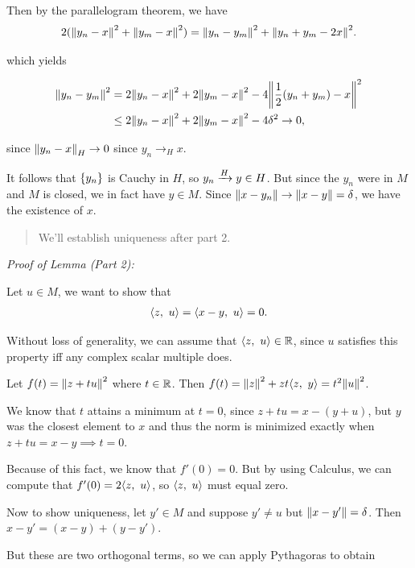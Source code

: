 Then by the parallelogram theorem, we have
\begin{align*}
2({\left\lVert {y_n - x} \right\rVert}^2 + {\left\lVert {y_m - x} \right\rVert}^2) = {\left\lVert {y_n - y_m} \right\rVert}^2 + {\left\lVert {y_n + y_m - 2x} \right\rVert}^2.
\end{align*}

which yields

\begin{align*}
{\left\lVert {y_n - y_m} \right\rVert}^2 
&= 2 {\left\lVert {y_n - x} \right\rVert}^2 + 2{\left\lVert {y_m - x} \right\rVert}^2 - 4{\left\lVert {\frac 1 2 (y_n + y_m) - x} \right\rVert}^2 \\
&\leq 2 {\left\lVert {y_n - x} \right\rVert}^2 + 2{\left\lVert {y_m - x} \right\rVert}^2 - 4\delta^2 \to 0,
\end{align*}

since \({\left\lVert {y_n - x} \right\rVert}_H \to 0\) since \(y_n \to_H x\).

It follows that \(\left\{{y_n}\right\}\) is Cauchy in \(H\), so
\(y_n \xrightarrow{H} y \in H\). But since the \(y_n\) were in \(M\) and
\(M\) is closed, we in fact have \(y\in M\). Since
\({\left\lVert {x - y_n} \right\rVert} \to {\left\lVert {x - y} \right\rVert} = \delta\), we have the existence of
\(x\).

\begin{quote}
We'll establish uniqueness after part 2.
\end{quote}

\emph{Proof of Lemma (Part 2):}

Let \(u\in M\), we want to show that
\begin{align*}
{\left\langle {z},~{u} \right\rangle} = {\left\langle {x-y},~{u} \right\rangle} = 0
.\end{align*}

Without loss of generality, we can assume that \({\left\langle {z},~{u} \right\rangle} \in {\mathbb{R}}\),
since \(u\) satisfies this property iff any complex scalar multiple
does.

Let \(f(t) = {\left\lVert {z + tu} \right\rVert}^2\) where \(t\in {\mathbb{R}}\). Then
\(f(t) = {\left\lVert {z} \right\rVert}^2 + zt{\left\langle {z},~{y} \right\rangle} = t^2 {\left\lVert {u} \right\rVert}^2\).

We know that \(t\) attains a minimum at \(t=0\), since
\(z + tu = x - (y + u)\), but \(y\) was the closest element to \(x\) and
thus the norm is minimized exactly when \(z + tu = x - y \implies t=0\).

Because of this fact, we know that \(f'(0) = 0\). But by using Calculus,
we can compute that \(f'(0) = 2 {\left\langle {z},~{u} \right\rangle}\), so \({\left\langle {z},~{u} \right\rangle}\) must
equal zero.

Now to show uniqueness, let \(y' \in M\) and suppose \(y' \neq u\) but
\({\left\lVert {x-y'} \right\rVert} = \delta\). Then \(x- y' = (x-y) + (y-y')\).

But these are two orthogonal terms, so we can apply Pythagoras to obtain

